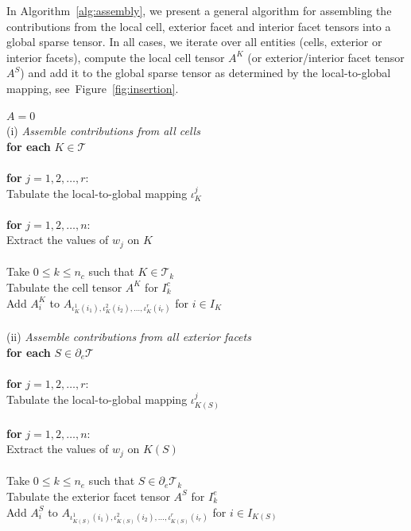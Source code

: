In Algorithm~\ref{alg:assembly}, we present a general algorithm for
assembling the contributions from the local cell, exterior facet and
interior facet tensors into a global sparse tensor.  In all cases, we
iterate over all entities (cells, exterior or interior facets),
compute the local cell tensor $A^K$ (or exterior/interior facet tensor
$A^S$) and add it to the global sparse tensor as determined by the
local-to-global mapping, see~Figure~\ref{fig:insertion}.


\begin{algorithm}
\footnotesize
$A = 0$ \\
(i) \emph{Assemble contributions from all cells} \\
\textbf{for each} $K \in \mathcal{T}$ \\
\\
\tab \textbf{for} $j = 1,2,\ldots,r$: \\
\tab\tab Tabulate the local-to-global mapping $\iota_K^j$ \\
\\
\tab \textbf{for} $j = 1,2,\ldots,n$: \\
\tab\tab Extract the values of $w_j$ on $K$
\\
\\
\tab Take $0 \leq k \leq n_c$ such that $K \in \mathcal{T}_k$ \\
\tab Tabulate the cell tensor $A^K$ for $I^c_k$ \\
\tab Add $A^K_i$ to $A_{\iota_K^1(i_1), \iota_K^2(i_2), \ldots, \iota_K^r(i_r)}$ for $i\in I_K$ \\
\\
(ii) \emph{Assemble contributions from all exterior facets} \\
\textbf{for each} $S \in \partial_e\mathcal{T}$ \\
\\
\tab \textbf{for} $j = 1,2,\ldots,r$: \\
\tab\tab Tabulate the local-to-global mapping $\iota_{K(S)}^j$ \\
\\
\tab \textbf{for} $j = 1,2,\ldots,n$: \\
\tab\tab Extract the values of $w_j$ on $K(S)$
\\
\\
\tab Take $0 \leq k \leq n_e$ such that $S \in \partial_e \mathcal{T}_k$ \\
\tab Tabulate the exterior facet tensor $A^S$ for $I^e_k$ \\
\tab Add $A^S_i$ to $A_{\iota_{K(S)}^1(i_1), \iota_{K(S)}^2(i_2), \ldots, \iota_{K(S)}^r(i_r)}$ for $i\in I_{K(S)}$ \\

\end{algorithm}
